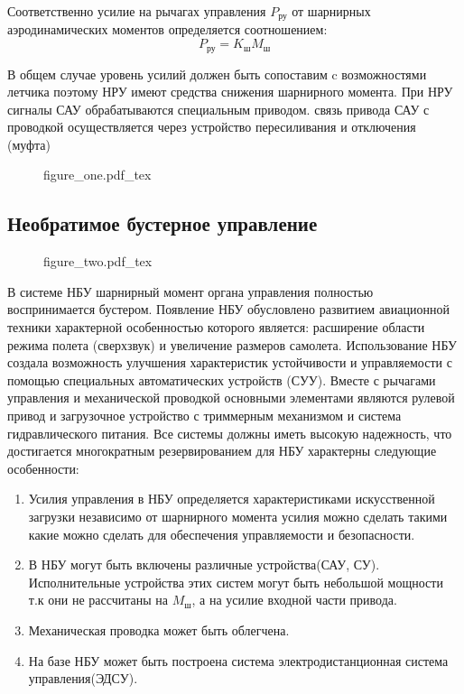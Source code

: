 \documentclass{article}
\begin{document}
Соответственно усилие на рычагах управления $P_\text{ру}$ от шарнирных
аэродинамических моментов определяется соотношением:
\[
	P_\text{ру} = K_\text{ш} M_\text{ш}
\]

В общем случае уровень усилий должен быть сопоставим c возможностями летчика
поэтому НРУ имеют средства снижения шарнирного момента. При НРУ сигналы САУ
обрабатываются специальным приводом. связь привода САУ с проводкой
осуществляется через устройство пересиливания и отключения (муфта)


\begin{figure}[H]
    \centering
	{figure_one.pdf_tex}
\end{figure}

\subsection{Необратимое бустерное управление}

\begin{figure}[H]
    \centering
	{figure_two.pdf_tex}
\end{figure}

В системе НБУ шарнирный момент органа управления полностью воспринимается
бустером. Появление НБУ обусловлено развитием авиационной техники характерной
особенностью которого является: расширение области режима полета (сверхзвук) и
увеличение размеров самолета. Использование НБУ создала возможность улучшения
характеристик устойчивости и управляемости с помощью специальных автоматических
устройств (СУУ). Вместе с рычагами управления и механической проводкой
основными элементами являются рулевой привод и загрузочное устройство с
триммерным механизмом и система гидравлического питания. Все системы должны
иметь высокую надежность, что достигается многократным резервированием для НБУ
характерны следующие особенности:
\begin{enumerate}
	\item Усилия управления в НБУ определяется характеристиками искусственной
	      загрузки независимо от шарнирного момента усилия можно сделать такими
	      какие можно сделать для обеспечения управляемости и безопасности.
	\item В НБУ могут быть включены различные устройства(САУ, СУ).
	      Исполнительные устройства этих систем могут быть небольшой мощности т.к
	      они не рассчитаны на $M_\text{ш}$, а на усилие входной части привода.
	\item Механическая проводка может быть облегчена.
	\item На базе НБУ может быть построена система электродистанционная система
	      управления(ЭДСУ).
\end{enumerate}
\end{document}
